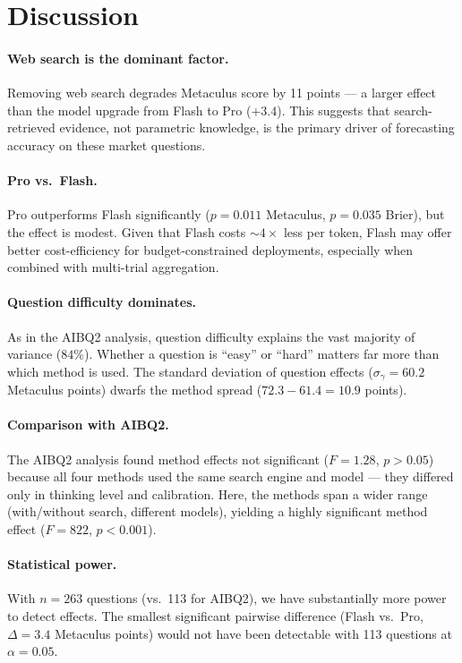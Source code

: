 \documentclass[11pt]{article}
\begin{document}
\section{Discussion}

\paragraph{Web search is the dominant factor.}
Removing web search degrades Metaculus score by 11 points --- a larger
effect than the model upgrade from Flash to Pro ($+3.4$).  This suggests
that search-retrieved evidence, not parametric knowledge, is the primary
driver of forecasting accuracy on these market questions.

\paragraph{Pro vs.\ Flash.}
Pro outperforms Flash significantly ($p = 0.011$ Metaculus, $p = 0.035$
Brier), but the effect is modest.  Given that Flash costs $\sim 4\times$
less per token, Flash may offer better cost-efficiency for budget-constrained
deployments, especially when combined with multi-trial aggregation.

\paragraph{Question difficulty dominates.}
As in the AIBQ2 analysis, question difficulty explains the vast majority
of variance ($84\%$).  Whether a question is ``easy'' or ``hard'' matters
far more than which method is used.  The standard deviation of question
effects ($\sigma_\gamma = 60.2$ Metaculus points) dwarfs the method spread
($72.3 - 61.4 = 10.9$ points).

\paragraph{Comparison with AIBQ2.}
The AIBQ2 analysis found method effects not significant ($F = 1.28$, $p > 0.05$)
because all four methods used the same search engine and model --- they
differed only in thinking level and calibration.  Here, the methods span
a wider range (with/without search, different models), yielding a highly
significant method effect ($F = 822$, $p < 0.001$).

\paragraph{Statistical power.}
With $n = 263$ questions (vs.\ 113 for AIBQ2), we have substantially more
power to detect effects.  The smallest significant pairwise difference
(Flash vs.\ Pro, $\Delta = 3.4$ Metaculus points) would not have been
detectable with 113 questions at $\alpha = 0.05$.
\end{document}
